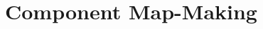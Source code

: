 \documentclass[../../thesis.tex]{subfiles}
\begin{document}
\chapter{Component Map-Making} \label{chap:CMM}

\minitoc
\end{document}
